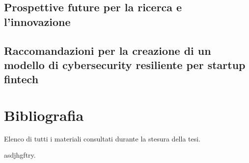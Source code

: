 \documentclass[a4paper,12pt]{report}
\begin{document}
\section{Prospettive future per la ricerca e l'innovazione}
\section{Raccomandazioni per la creazione di un modello di cybersecurity resiliente per startup fintech}

\chapter*{Bibliografia}
Elenco di tutti i materiali consultati durante la stesura della tesi.


%
%
asdjhgftry.
% 
% 



%
\printbibliography

% 
\end{document}
